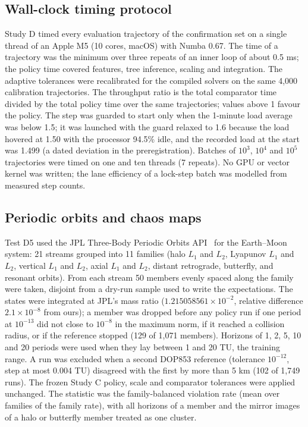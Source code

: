 \documentclass[10pt,letterpaper]{article}
\begin{document}
\subsection*{Wall-clock timing protocol}
Study D timed every evaluation trajectory of the confirmation set on a single thread of an Apple M5 (10 cores, macOS) with Numba 0.67. The time of a trajectory was the minimum over three repeats of an inner loop of about 0.5 ms; the policy time covered features, tree inference, scaling and integration. The adaptive tolerances were recalibrated for the compiled solvers on the same 4,000 calibration trajectories. The throughput ratio is the total comparator time divided by the total policy time over the same trajectories; values above 1 favour the policy. The step was guarded to start only when the 1-minute load average was below 1.5; it was launched with the guard relaxed to 1.6 because the load hovered at 1.50 with the processor 94.5\% idle, and the recorded load at the start was 1.499 (a dated deviation in the preregistration). Batches of $10^{3}$, $10^{4}$ and $10^{5}$ trajectories were timed on one and ten threads (7 repeats). No GPU or vector kernel was written; the lane efficiency of a lock-step batch was modelled from measured step counts.

\subsection*{Periodic orbits and chaos maps}
Test D5 used the JPL Three-Body Periodic Orbits API~\cite{jplperiodic} for the Earth--Moon system: 21 streams grouped into 11 families (halo $L_1$ and $L_2$, Lyapunov $L_1$ and $L_2$, vertical $L_1$ and $L_2$, axial $L_1$ and $L_2$, distant retrograde, butterfly, and resonant orbits). From each stream 50 members evenly spaced along the family were taken, disjoint from a dry-run sample used to write the expectations. The states were integrated at JPL's mass ratio ($1.215058561\times10^{-2}$, relative difference $2.1\times10^{-8}$ from ours); a member was dropped before any policy run if one period at $10^{-13}$ did not close to $10^{-8}$ in the maximum norm, if it reached a collision radius, or if the reference stopped (129 of 1,071 members). Horizons of 1, 2, 5, 10 and 20 periods were used when they lay between 1 and 20 TU, the training range. A run was excluded when a second DOP853 reference (tolerance $10^{-12}$, step at most 0.004 TU) disagreed with the first by more than 5 km (102 of 1,749 runs). The frozen Study C policy, scale and comparator tolerances were applied unchanged. The statistic was the family-balanced violation rate (mean over families of the family rate), with all horizons of a member and the mirror images of a halo or butterfly member treated as one cluster.
\end{document}
